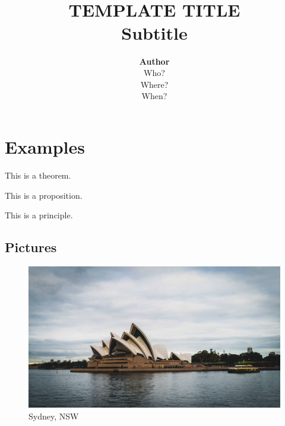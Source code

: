 
\title{ \normalsize \textsc{}
		\\ [2.0cm]
		\HRule{1.5pt} \\
		\LARGE \textbf{\uppercase{Template Title}
		\HRule{2.0pt} \\ [0.6cm] \LARGE{Subtitle} \vspace*{10\baselineskip}}
		}
\date{}
\author{\textbf{Author} \\ 
		Who? \\
		Where? \\
		When?}

\maketitle
\newpage

\tableofcontents
\newpage


\section{Examples}

\begin{theorem}
    This is a theorem.
\end{theorem}

\begin{proposition}
    This is a proposition.
\end{proposition}

\begin{principle}
    This is a principle.
\end{principle}


\subsection{Pictures}

\begin{figure}[htbp]
    \center
    \includegraphics[scale=0.06]{img/photo.jpg}
    \caption{Sydney, NSW}
\end{figure}

